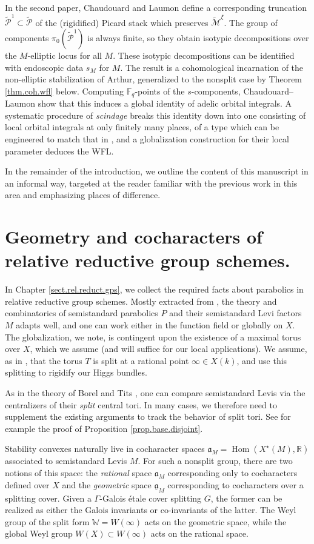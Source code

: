 \documentclass[openany]{amsbook}
\theoremstyle{definition}
\theoremstyle{remark}
\numberwithin{equation}{section}
\newcommand{\R}{\mathbb{R}}
\newcommand{\F}{\mathbb{F}}
\newcommand{\W}{\mathbb{W}}
\newcommand{\cM}{\mathcal{M}}
\newcommand{\cP}{\mathcal{P}}
\newcommand{\ul}[1]{\underline{#1}}
\renewcommand{\-}{\operatorname{-}}
\newcommand{\Hom}{\operatorname{Hom}}
\renewcommand{\a}{\mathfrak{a}}
\newcommand{\ctM}{\widetilde{\cM}}
\newcommand{\ctP}{\widetilde{\cP}}
\begin{document}
In the second paper, Chaudouard and Laumon define a corresponding truncation $\ctP^1 \subset \ctP$ of the (rigidified) Picard stack which preserves $\ctM^{\xi}$. The group of components $\pi_0(\ctP^1)$ is always finite, so they obtain isotypic decompositions over the $M$-elliptic locus for all $M$. These isotypic decompositions can be identified with endoscopic data $s_M$ for $M$. The result is a cohomological incarnation of the non-elliptic stabilization of Arthur, generalized to the nonsplit case by Theorem \ref{thm.coh.wfl} below. Computing $\F_q$-points of the $s$-components, Chaudouard--Laumon show that this induces a global identity of adelic orbital integrals. A systematic procedure of \textit{scindage} breaks this identity down into one consisting of local orbital integrals at only finitely many places, of a type which can be engineered to match that in \cite{MWStabII}, and a globalization construction for their local parameter deduces the WFL.


In the remainder of the introduction, we outline the content of this manuscript in an informal way, targeted at the reader familiar with the previous work in this area and emphasizing places of difference.

\section{Geometry and cocharacters of relative reductive group schemes.}

In Chapter \ref{sect.rel.reduct.gps}, we collect the required facts about parabolics in relative reductive group schemes. Mostly extracted from \cite{conradrgs}, the theory and combinatorics of semistandard parabolics $P$ and their semistandard Levi factors $M$ adapts well, and one can work either in the function field or globally on $X$. The globalization, we note, is contingent upon the existence of a maximal torus over $X$, which we assume (and will suffice for our local applications). We assume, as in \cite{ngofl}, that the torus $T$ is split at a rational point $\infty \in X(k)$, and use this splitting to rigidify our Higgs bundles.

As in the theory of Borel and Tits \cite{BorelTits}, one can compare semistandard Levis via the centralizers of their \textit{split} central tori. In many cases, we therefore need to supplement the existing arguments to track the behavior of split tori. See for example the proof of Proposition \ref{prop.base.disjoint}.

Stability convexes naturally live in cocharacter spaces $\a_M = \Hom(X^\star(M), \R)$ associated to semistandard Levis $M$. For such a nonsplit group, there are two notions of this space: the \textit{rational} space $\a_M$ corresponding only to cocharacters defined over $X$ and the \textit{geometric} space $\ul{\a}_M$ corresponding to cocharacters over a splitting cover. Given a $\Gamma$-Galois \'etale cover splitting $G$, the former can be realized as either the Galois invariants or co-invariants of the latter. The Weyl group of the split form $\W = W(\infty)$ acts on the geometric space, while the global Weyl group $W(X) \subset W(\infty)$ acts on the rational space. 
\end{document}
